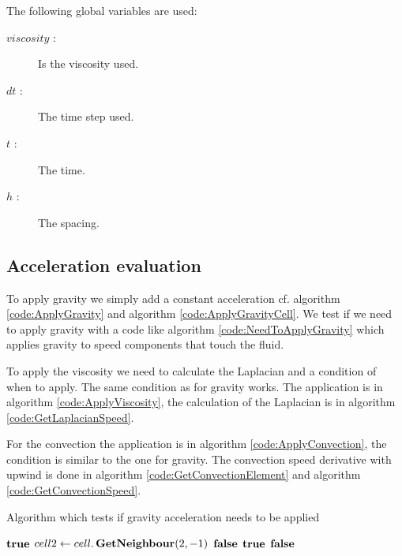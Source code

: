 The following global variables are used:
\begin{description}
 \item[$viscosity$ :] Is the viscosity used.
 \item[$dt$ :] The time step used.
 \item[$t$ :] The time.
 \item[$h$ :] The spacing.
\end{description}


\subsection{Acceleration evaluation}

To apply gravity we simply add a constant acceleration cf. algorithm \ref{code:ApplyGravity} and algorithm \ref{code:ApplyGravityCell}.
We test if we need to apply gravity with a code like algorithm \ref{code:NeedToApplyGravity} which applies gravity to speed components
that touch the fluid.

To apply the viscosity we need to calculate the Laplacian and a condition of when to apply.
The same condition as for gravity works.
The application is in algorithm \ref{code:ApplyViscosity}, the calculation of the Laplacian is in algorithm \ref{code:GetLaplacianSpeed}.

For the convection the application is in algorithm \ref{code:ApplyConvection}, the condition is similar to the one for gravity.
The convection speed derivative with upwind is done in algorithm \ref{code:GetConvectionElement} and algorithm \ref{code:GetConvectionSpeed}.

\begin{algorithm}
\caption{Algorithm which tests if gravity acceleration needs to be applied}
\label{code:NeedToApplyGravity}
\begin{algorithmic}[1]
			\State \Return $\mathop{\textbf{true}}$ 
		\EndIf
		\State $cell2 \gets cell.\mathop{\textbf{GetNeighbour}}(2,-1)$ 
			\State \Return $\mathop{\textbf{false}}$ 
		\EndIf
			\State \Return $\mathop{\textbf{true}}$ 
		\EndIf
		\State \Return $\mathop{\textbf{false}}$
	\EndFunction
	\end{algorithmic}
\end{algorithm}

